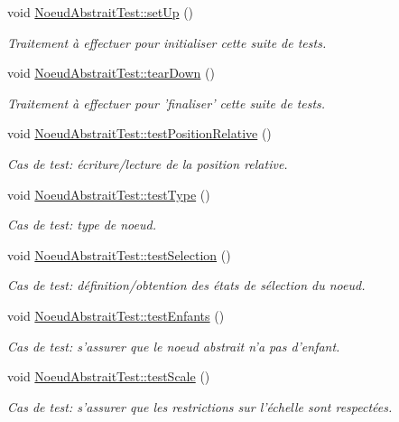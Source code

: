 \begin{DoxyCompactItemize}
void \hyperlink{group__inf2990_ga4d2fe388f550ba374823d09b5c8ebe77}{Noeud\-Abstrait\-Test\-::set\-Up} ()
\begin{DoxyCompactList}\small\item\em Traitement à effectuer pour initialiser cette suite de tests. \end{DoxyCompactList}\item 
void \hyperlink{group__inf2990_ga2c5c558ff7e40386c724a55b670af417}{Noeud\-Abstrait\-Test\-::tear\-Down} ()
\begin{DoxyCompactList}\small\item\em Traitement à effectuer pour 'finaliser' cette suite de tests. \end{DoxyCompactList}\item 
void \hyperlink{group__inf2990_gaed7a5423d2a3a7518aef743f17d32ccd}{Noeud\-Abstrait\-Test\-::test\-Position\-Relative} ()
\begin{DoxyCompactList}\small\item\em Cas de test\-: écriture/lecture de la position relative. \end{DoxyCompactList}\item 
void \hyperlink{group__inf2990_gadf554a62266cc21c7c48f6a27ad7c752}{Noeud\-Abstrait\-Test\-::test\-Type} ()
\begin{DoxyCompactList}\small\item\em Cas de test\-: type de noeud. \end{DoxyCompactList}\item 
void \hyperlink{group__inf2990_gac044744b04574c86418a57b39e3238ff}{Noeud\-Abstrait\-Test\-::test\-Selection} ()
\begin{DoxyCompactList}\small\item\em Cas de test\-: définition/obtention des états de sélection du noeud. \end{DoxyCompactList}\item 
void \hyperlink{group__inf2990_ga0e65b00620e79646a9efd8a93c4fc650}{Noeud\-Abstrait\-Test\-::test\-Enfants} ()
\begin{DoxyCompactList}\small\item\em Cas de test\-: s'assurer que le noeud abstrait n'a pas d'enfant. \end{DoxyCompactList}\item 
void \hyperlink{group__inf2990_gab9182c635c672eb2ade3f2b2b5043244}{Noeud\-Abstrait\-Test\-::test\-Scale} ()
\begin{DoxyCompactList}\small\item\em Cas de test\-: s'assurer que les restrictions sur l'échelle sont respectées. \end{DoxyCompactList}\item 

\end{DoxyCompactItemize}
